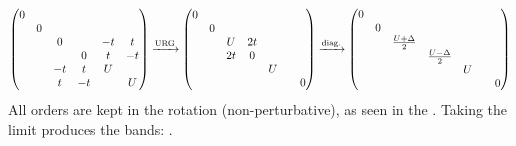\documentclass[12pt]{article}
\begin{document}
\begin{gather*}
\begin{pmatrix}
	0 &&&&&\\
	& 0&&&&\\
	&& 0 && -t & t \\
	&&& 0 & t & -t \\
	&& -t & t & U & \\
	&& t & -t && U \\
\end{pmatrix}
\xrightarrow{\text{URG}}
\begin{pmatrix}
	0 &&&&& \\
	& 0 &&&& \\
	&& U & 2t && \\
	&& 2t & 0 && \\
	&&&& U & \\
	&&&&& & 0 \\
\end{pmatrix}
\xrightarrow{\text{diag.}}
\begin{pmatrix}
	0 &&&&& \\
	& 0 &&&& \\
	&& \frac{U+\Delta}{2} &&& \\
	&&& \frac{U-\Delta}{2} && \\
	&&&& U & \\
	&&&&& & 0 \\
\end{pmatrix}
\end{gather*}
All orders are kept in the rotation (non-perturbative), as seen in the . Taking the limit  produces the bands: .
\end{document}
